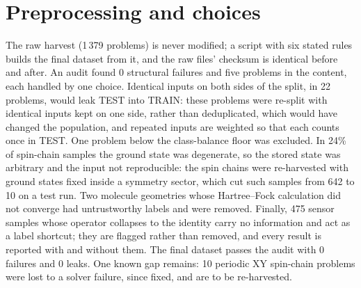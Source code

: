 \documentclass[10pt,a4paper]{article}
\begin{document}
\section{Preprocessing and choices}

The raw harvest (1\,379 problems) is never modified; a script with six stated rules builds the final dataset
from it, and the raw files' checksum is identical before and after. An audit found 0 structural failures and
five problems in the content, each handled by one choice. Identical inputs on both sides of the split, in 22
problems, would leak TEST into TRAIN: these problems were re-split with identical inputs kept on one side,
rather than deduplicated, which would have changed the population, and repeated inputs are weighted so that
each counts once in TEST. One problem below the class-balance floor was excluded. In 24\% of spin-chain
samples the ground state was degenerate, so the stored state was arbitrary and the input not reproducible:
the spin chains were re-harvested with ground states fixed inside a symmetry sector, which cut such samples
from 642 to 10 on a test run. Two molecule geometries whose Hartree--Fock calculation did not converge had
untrustworthy labels and were removed. Finally, 475 sensor samples whose operator collapses to the identity
carry no information and act as a label shortcut; they are flagged rather than removed, and every result is
reported with and without them. The final dataset passes the audit with 0 failures and 0 leaks. One known
gap remains: 10 periodic XY spin-chain problems were lost to a solver failure, since fixed, and are to be
re-harvested.
\end{document}
